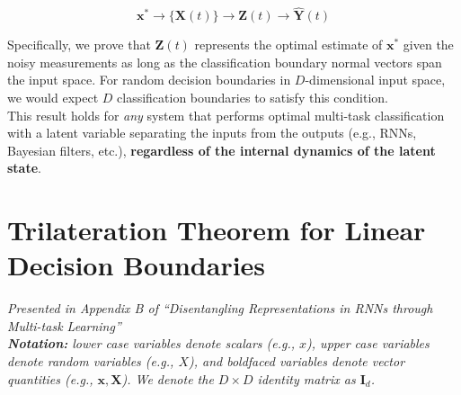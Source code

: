 \documentclass[12pt]{article}
\begin{document}
\begin{equation}
    \mathbf x^* 
    \to \{\mathbf X(t)\} 
    \to \mathbf Z(t)
    \to \hat{\mathbf Y}(t)
\end{equation}

Specifically, we prove that $\mathbf Z(t)$ represents the optimal estimate of $\mathbf x^*$ given the noisy measurements as long as the classification boundary normal vectors span the input space. 
For random decision boundaries in $D$-dimensional input space, we would expect $D$ classification boundaries to satisfy this condition.\\


This result holds for \textit{any} system that performs optimal multi-task classification with a latent variable separating the inputs from the outputs (e.g., RNNs, Bayesian filters, etc.), \textbf{regardless of the internal dynamics of the latent state}.



\section{Trilateration Theorem for Linear Decision Boundaries}

\textit{Presented in Appendix B of ``Disentangling Representations in RNNs through Multi-task Learning''} \\


\textit{\textbf{Notation:} lower case variables denote scalars (e.g., $x$), upper case variables denote random variables (e.g., $X$), and boldfaced variables denote vector quantities (e.g., $\mathbf x, \mathbf X$). 
We denote the $D\times D$ identity matrix as $\mathbf I_d$.} \\
\end{document}
